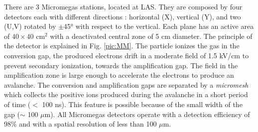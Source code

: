 There are 3 Micromegas stations, located at LAS. They are composed by four detectors each with different directions : horizontal (X), vertical (Y), and two (U,V) rotated by $\pm$45° with respect to the vertical. Each plane has an active area of $40 \times 40$ cm$^2$ with a deactivated central zone of 5 cm diameter. The principle of the detector is explained in Fig. \ref{pic:MM}. The particle ionizes the gas in the conversion gap, the produced electrons drift in a moderate field of 1.5 kV/cm to prevent secondary ionization, towards the amplification gap. The field in the amplification zone is large enough to accelerate the electrons to produce an avalanche. The conversion and amplification gaps are separated by a \textit{micromesh} which collects the positive ions produced during the avalanche in a short period of time ($<$ 100 ns). This feature is possible because of the small width of the gap ($\sim$ 100 $\mu$m). All Micromegas detectors operate with a detection efficiency of 98\% and with a spatial resolution of less than 100 $\mu$m.

